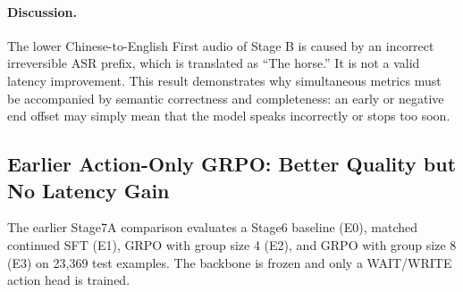 \documentclass[11pt,a4paper]{article}
\begin{document}
\begin{table}[H]
\centering
\caption{Chinese-to-English Stage A/B First audio and generated content for a 9.66-s source.}
\label{tab:zh2en_latency}
\end{table}

\paragraph{Discussion.}
The lower Chinese-to-English First audio of Stage B is caused by an incorrect irreversible ASR prefix, which is translated as ``The horse.'' It is not a valid latency improvement. This result demonstrates why simultaneous metrics must be accompanied by semantic correctness and completeness: an early or negative end offset may simply mean that the model speaks incorrectly or stops too soon.

\subsection{Earlier Action-Only GRPO: Better Quality but No Latency Gain}

The earlier Stage7A comparison evaluates a Stage6 baseline (E0), matched continued SFT (E1), GRPO with group size 4 (E2), and GRPO with group size 8 (E3) on 23,369 test examples. The backbone is frozen and only a WAIT/WRITE action head is trained.
\end{document}
